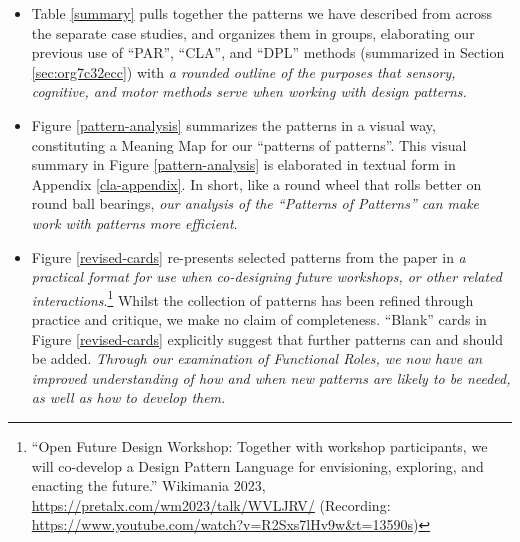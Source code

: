 \documentclass[acmlarge,timestamp]{acmart}
\begin{document}
\begin{itemize}
\item Table \ref{summary} pulls together the patterns we have
  described from across the separate case studies, and organizes them
  in groups, elaborating our previous use of “PAR”, “CLA”, and “DPL”
  methods (summarized in Section \ref{sec:org7c32ecc}) with \emph{a
  rounded outline of the purposes that sensory, cognitive, and motor
  methods serve when working with design patterns.}

\item Figure \ref{pattern-analysis} summarizes the patterns in a
  visual way, constituting a {\sc Meaning Map} for our “patterns of
  patterns”.  This visual summary in Figure \ref{pattern-analysis} is
  elaborated in textual form in Appendix \ref{cla-appendix}.  In
  short, like a round wheel that rolls better on round ball bearings,
  \emph{our analysis of the “Patterns of Patterns” can make work with
  patterns more efficient}.

\item Figure \ref{revised-cards} re-presents selected patterns from
  the paper in \emph{a practical format for use when co-designing
  future workshops, or other related interactions}.\footnote{``Open
  Future Design Workshop: Together with workshop participants, we will
  co-develop a Design Pattern Language for envisioning, exploring, and
  enacting the future.”  Wikimania 2023,
  \url{https://pretalx.com/wm2023/talk/WVLJRV/} (Recording:
  \url{https://www.youtube.com/watch?v=R2Sxs7lHv9w&t=13590s})} Whilst
  the collection of patterns has been refined through practice and
  critique, we make no claim of completeness.  “Blank” cards in Figure
  \ref{revised-cards} explicitly suggest that further patterns can and
  should be added.  \emph{Through our examination of {\sc Functional
    Roles}, we now have an improved understanding of how and when new
  patterns are likely to be needed, as well as how to develop them.}
\end{itemize}
\end{document}
